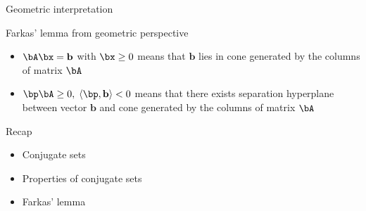 \documentclass[12pt]{beamer}
\begin{document}
\begin{frame}{Geometric interpretation}
\begin{block}{Farkas' lemma from geometric perspective}
\begin{itemize}
\item $\bA\bx = \mathbf{b}$ with $\bx \geq 0$ means that $\mathbf{b}$ lies in cone generated by the columns of matrix $\bA$
\item $\bp\bA \geq 0, \; \langle \bp, \mathbf{b} \rangle < 0$ means that there exists separation hyperplane between vector $\mathbf{b}$ and cone generated by the columns of matrix $\bA$
\end{itemize}
\end{block}
\end{frame}

\begin{frame}{Recap}
\begin{itemize}
\item Conjugate sets
\item Properties of conjugate sets
\item Farkas' lemma
\end{itemize}

\end{frame}
\end{document}
